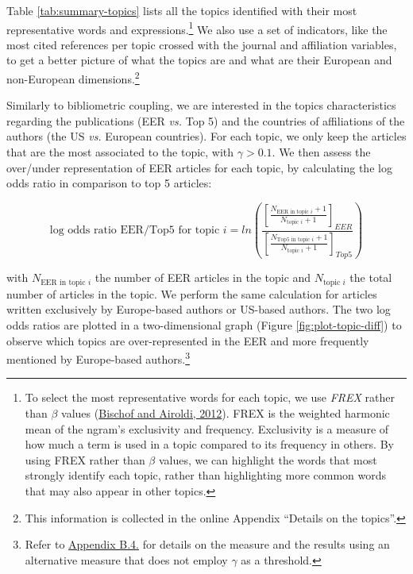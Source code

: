 \documentclass[
  12pt,
  onecolumn]{article}
\begin{document}
Table \ref{tab:summary-topics} lists all the topics identified with their most representative words and expressions.\footnote{To select the most representative words for each topic, we use \emph{FREX} rather than \(\beta\) values (\protect\hyperlink{ref-bischof2012}{Bischof and Airoldi, 2012}). FREX is the weighted harmonic mean of the ngram's exclusivity and frequency. Exclusivity is a measure of how much a term is used in a topic compared to its frequency in others. By using FREX rather than \(\beta\) values, we can highlight the words that most strongly identify each topic, rather than highlighting more common words that may also appear in other topics.} We also use a set of indicators, like the most cited references per topic crossed with the journal and affiliation variables, to get a better picture of what the topics are and what are their European and non-European dimensions.\footnote{This information is collected in the online Appendix ``Details on the topics''.}

Similarly to bibliometric coupling, we are interested in the topics characteristics regarding the publications (EER \emph{vs.} Top 5) and the countries of affiliations of the authors (the US \emph{vs.} European countries). For each topic, we only keep the articles that are the most associated to the topic, with \(\gamma > 0.1\). We then assess the over/under representation of EER articles for each topic, by calculating the log odds ratio in comparison to top 5 articles:

\[
\text{log odds ratio EER/Top5 for topic }i = ln(\frac{[\frac{N_{\text{EER in topic }i}+1}{N_{\text{topic }i} + 1}]_{EER}}{[\frac{N_{\text{Top5 in topic }i}+1}{N_{\text{topic }i} + 1}]_{Top5}})
\]

with \(N_{\text{EER in topic }i}\) the number of EER articles in the topic and \(N_{\text{topic }i}\) the total number of articles in the topic. We perform the same calculation for articles written exclusively by Europe-based authors or US-based authors. The two log odds ratios are plotted in a two-dimensional graph (Figure \ref{fig:plot-topic-diff}) to observe which topics are over-represented in the EER and more frequently mentioned by Europe-based authors.\footnote{Refer to \protect\hyperlink{topic}{Appendix B.4.} for details on the measure and the results using an alternative measure that does not employ \(\gamma\) as a threshold.}
\end{document}
